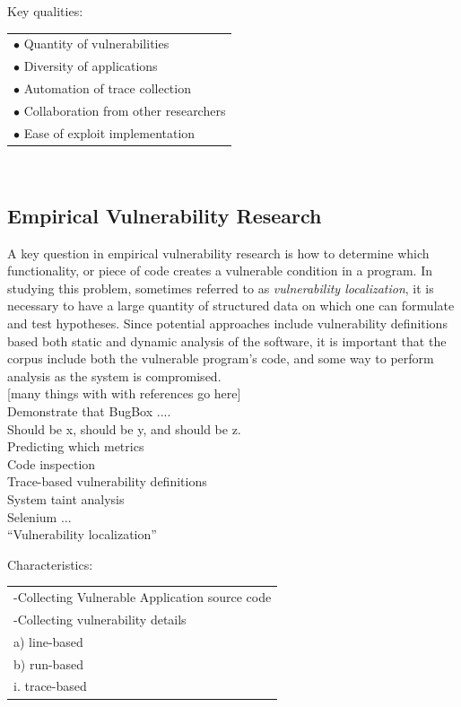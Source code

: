 \documentclass[letterpaper,twocolumn,10pt]{article}
\begin{document}
Key qualities:\\
 \begin{tabular}{ l }
   $\bullet$ Quantity of vulnerabilities\\
   $\bullet$ Diversity of applications\\
   $\bullet$ Automation of trace collection\\
   $\bullet$ Collaboration from other researchers\\
   $\bullet$ Ease of exploit implementation\\

 \end{tabular}
\\


\subsection{Empirical Vulnerability Research}


A key question in empirical vulnerability research is how to determine which functionality, or piece of code creates a vulnerable condition in a program. In studying this problem, sometimes referred to as \emph{vulnerability localization}, it is necessary to have a large quantity of structured data on which one can formulate and test hypotheses. Since potential approaches include vulnerability definitions based both static and dynamic analysis of the software, it is important that the corpus include both the vulnerable program's code, and some way to perform analysis as the system is compromised.\\


[many things with with references go here]\\

Demonstrate that BugBox ....\\
Should be x, should be y, and should be z.\\
Predicting which metrics  \\

Code inspection\\
Trace-based vulnerability definitions\\
System taint analysis\\
Selenium ... \\


``Vulnerability localization''

Characteristics:\\
 \begin{tabular} { l }
   -Collecting Vulnerable Application source code\\
   -Collecting vulnerability details\\
     a) line-based\\
     b) run-based\\
      i. trace-based\\
 \end{tabular}\\
\end{document}
